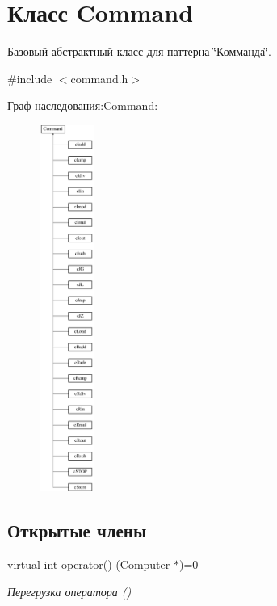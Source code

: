 \hypertarget{class_command}{}\section{Класс Command}
\label{class_command}


Базовый абстрактный класс для паттерна \char`\"{}Комманда\char`\"{}.  




{\ttfamily \#include $<$command.\+h$>$}

Граф наследования\+:Command\+:\begin{figure}[H]
\begin{center}
\leavevmode
\includegraphics[height=12.000000cm]{class_command}
\end{center}
\end{figure}
\subsection*{Открытые члены}
\begin{DoxyCompactItemize}
\item 
\hypertarget{class_command_a79939b66f3de892e91d7710844294716}{}\label{class_command_a79939b66f3de892e91d7710844294716} 
virtual int \hyperlink{class_command_a79939b66f3de892e91d7710844294716}{operator()} (\hyperlink{class_computer}{Computer} $\ast$)=0
\begin{DoxyCompactList}\small\item\em Перегрузка оператора () \end{DoxyCompactList}\end{DoxyCompactItemize}
